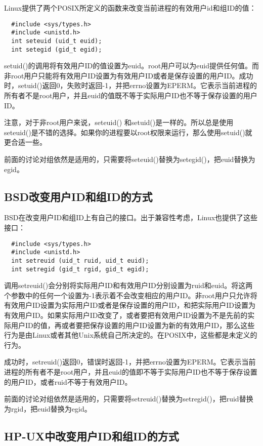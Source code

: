Linux提供了两个POSIX所定义的函数来改变当前进程的有效用户id和组ID的值：

\begin{lstlisting}
  #include <sys/types.h>
  #include <unistd.h>
  int seteuid (uid_t euid);
  int setegid (gid_t egid);
\end{lstlisting}

setuid()的调用将有效用户ID的值设置为euid。root用户可以为euid提供任何值。而非root用户只能将有效用户ID设置为有效用户ID或者是保存设置的用户ID。成功时，setuid()返回0，失败时返回-1，并把errno设置为EPERM。它表示当前进程的所有者不是root用户，并且euid的值既不等于实际用户ID也不等于保存设置的用户ID。

注意，对于非root用户来说，seteuid() 和setuid()是一样的。所以总是使用seteuid()是不错的选择。如果你的进程要以root权限来运行，那么使用setuid()就更合适一些。

前面的讨论对组依然是适用的，只需要将seteuid()替换为setegid()，把euid替换为egid。

\subsection{BSD改变用户ID和组ID的方式}

BSD在改变用户ID和组ID上有自己的接口。出于兼容性考虑，Linux也提供了这些接口：

\begin{lstlisting}
  #include <sys/types.h>
  #include <unistd.h>
  int setreuid (uid_t ruid, uid_t euid);
  int setregid (gid_t rgid, gid_t egid);
\end{lstlisting}

调用setreuid()会分别将实际用户ID和有效用户ID分别设置为ruid和euid。将这两个参数中的任何一个设置为-1表示着不会改变相应的用户ID。非root用户只允许将有效用户ID设置为实际用户ID或者是保存设置的用户ID，和把实际用户ID设置为有效用户ID。如果实际用户ID改变了，或者要把有效用户ID设置为不是先前的实际用户ID的值，再或者要把保存设置的用户ID设置为新的有效用户ID，那么这些行为是由Linux或者其他Unix系统自己所决定的。在POSIX中，这些都是未定义的行为。

成功时，setreuid()返回0，错误时返回-1，并把errno设置为EPERM。它表示当前进程的所有者不是root用户，并且euid的值即不等于实际用户ID也不等于保存设置的用户ID，或者ruid不等于有效用户ID。

前面的讨论对组依然是适用的，只需要将setreuid()替换为setregid()，把ruid替换为rgid，把euid替换为egid。

\subsection{HP-UX中改变用户ID和组ID的方式}

